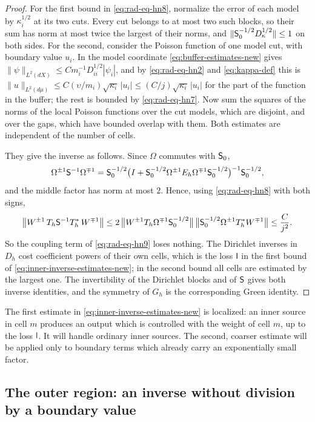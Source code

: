 \begin{proof}
For the first bound in \eqref{eq:rad-eq-hn8}, normalize the error of
each model by $\kappa_i^{1/2}$ at its two cuts. Every cut belongs to
at most two such blocks, so their sum has norm at most twice the
largest of their norms, and $\|\mathsf S_0^{-1/2}D_\kappa^{1/2}\|\le1$ on
both sides.
For the second, consider the Poisson function of one model cut, with
boundary value $u_i$. In the model coordinate
\eqref{eq:buffer-estimates-new} gives
$\|\psi\|_{L^2(dX)}\le Cm_i^{-1}D_{ii}^{1/2}|\psi_i|$, and by
\eqref{eq:rad-eq-hn2} and \eqref{eq:kappa-def} this is
$\|u\|_{L^2(d\mu)}\le C(\upsilon/m_i)\sqrt{\kappa_i}\,|u_i|
\le(C/j)\sqrt{\kappa_i}\,|u_i|$ for the part of the function in the
buffer; the rest is bounded by \eqref{eq:rad-eq-hn7}. Now sum the
squares of the norms of the local Poisson functions over the cut
models, which are disjoint, and over the gaps, which have bounded
overlap with them. Both estimates are independent of the number of
cells.

They give the inverse as follows. Since $\Omega$ commutes with
$\mathsf S_0$,
\[
 \Omega^{\pm1}\mathsf S^{-1}\Omega^{\mp1}
 =\mathsf S_0^{-1/2}\bigl(I+\mathsf S_0^{-1/2}\Omega^{\pm1}E_h\Omega^{\mp1}
   \mathsf S_0^{-1/2}\bigr)^{-1}\mathsf S_0^{-1/2},
\]
and the middle factor has norm at most $2$. Hence, using
\eqref{eq:rad-eq-hn8} with both signs,
\[
 \bigl\|W^{\pm1}\,T_h\mathsf S^{-1}T_h^*\,W^{\mp1}\bigr\|
 \le2\,\bigl\|W^{\pm1}T_h\Omega^{\mp1}\mathsf S_0^{-1/2}\bigr\|\,
       \bigl\|\mathsf S_0^{-1/2}\Omega^{\pm1}T_h^*W^{\mp1}\bigr\|
 \le\frac{C}{j^2} .
\]
So the coupling term of \eqref{eq:rad-eq-hn9} loses nothing. The
Dirichlet inverses in $D_h$ cost
coefficient powers of their own cells, which is the loss $\mathsf l$ in the
first bound of \eqref{eq:inner-inverse-estimates-new}; in the second
bound all cells are estimated by the largest one. The invertibility of
the Dirichlet blocks and of $\mathsf S$ gives both inverse identities, and
the symmetry of $G_h$ is the corresponding Green identity.
\end{proof}

The first estimate in \eqref{eq:inner-inverse-estimates-new} is
localized: an inner source in cell $m$ produces an output which is
controlled with the weight of cell $m$, up to the loss $\mathsf l$. It will
handle ordinary inner sources. The second, coarser estimate will be
applied only to boundary terms which already carry an exponentially
small factor.

\subsection{The outer region: an inverse without division by a boundary value}
\label{subsec:outer-inverse}

